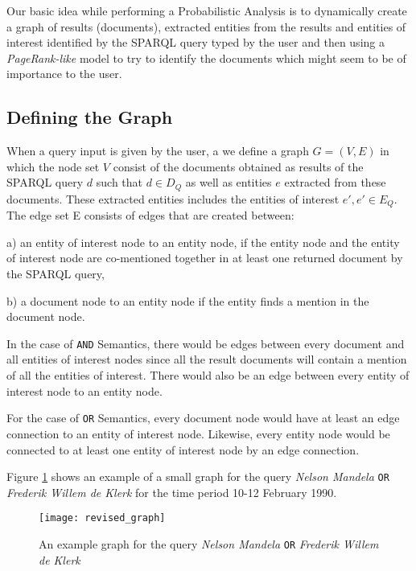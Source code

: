 
Our basic idea while performing a Probabilistic Analysis is to dynamically create
a graph of results (documents), extracted entities from the results
and entities of interest identified by the SPARQL query typed by the user
and then using a {\em PageRank-like} model \cite{page1999pagerank} to try to identify the
documents which might seem to be of importance to the user.

\subsection*{Defining the Graph}
When a query input is given by the user, a we define a graph $G = (V, E)$ in which the
node set $V$ consist of the documents obtained as results
of the SPARQL query $d$ such that
$d \in D_Q$ as well as entities $e$ extracted from these documents.
These extracted entities includes the entities of interest $e', e' \in E_Q$.
The edge set E consists of edges that are created between:
\begin{compactitem}
\item[a)] an entity of interest node to an entity node,
if the entity node and the entity of interest node are co-mentioned together
in at least one returned document by the SPARQL query,
\item[b)] a document node to an entity
node if the entity finds a mention in the document node.
\end{compactitem}

\vspace{2mm}\noindent
In the case of {\tt AND} Semantics, there would be edges between every document and all
entities of interest nodes
since all the result documents will contain a mention of all the entities of interest.
There would also be an edge between every entity of interest node to an entity node.

\vspace{2mm}\noindent
For the case of {\tt OR} Semantics, every document node would have at least an edge
connection to an entity of interest node. Likewise, every entity node would be connected
to at least one entity of interest node by an edge connection.

\vspace{2mm}\noindent
Figure \ref{fig:revised_graph} shows an example of a small graph for the query {\em
Nelson Mandela} {\tt OR} {\em Frederik Willem de Klerk} for the time period 10-12
February 1990.


\begin{figure}[ht]
\begin{mdframed}
    \centering
    \texttt{[image: revised\_graph]}
\end{mdframed}
    \caption{An example graph for the query {\em Nelson Mandela} {\tt OR}
                    {\em Frederik Willem de Klerk}}
    \label{fig:revised_graph}
\end{figure}

